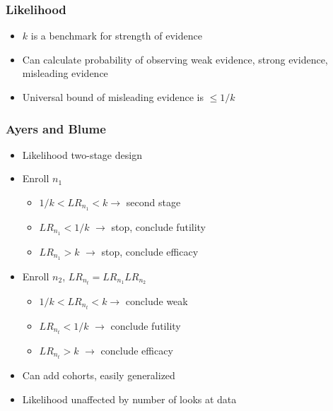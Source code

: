 \documentclass{beamer}\usepackage[]{graphicx}\usepackage[]{color}
\begin{document}
\begin{frame}
\frametitle{Likelihood}
    \begin{itemize}
        \item $k$ is a benchmark for strength of evidence
        \item Can calculate probability of observing weak evidence, strong evidence, misleading evidence %
        \item Universal bound of misleading evidence is $\leq 1/k$
    \end{itemize}
\end{frame}

\begin{frame}
\frametitle{Ayers and Blume}
    \begin{itemize}
        \item Likelihood two-stage design
        \item Enroll $n_1$ 
        \begin{itemize}
           \item $1/k < LR_{n_1} < k \rightarrow$ second stage
           \item $LR_{n_1} < 1/k$ $\rightarrow$ stop, conclude futility
           \item $LR_{n_1} > k$ $\rightarrow$ stop, conclude efficacy
        \end{itemize}
        \item Enroll $n_2$, $LR_{n_t}=LR_{n_1}LR_{n_2}$
        \begin{itemize}
           \item $1/k < LR_{n_t} < k \rightarrow$ conclude weak
           \item $LR_{n_t} < 1/k$ $\rightarrow$ conclude futility
           \item $LR_{n_t} > k$ $\rightarrow$ conclude efficacy
        \end{itemize}
        \item Can add cohorts, easily generalized
        \item Likelihood unaffected by number of looks at data
    \end{itemize}
\end{frame}
\end{document}

